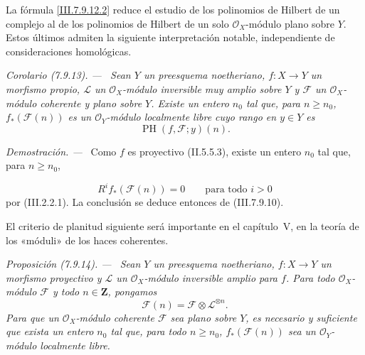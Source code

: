 \documentclass[10pt,oneside]{book}
\newcommand{\bb}[1]{\mathbf{#1}}
\newcommand{\sref}[2][]{\textup{(#2)}}
\newcommand{\oldpage}[2][]{\setcounter{footnote}{0}\marginpar{\scriptsize\textbf{#1}~|~#2}\ignorespaces}
\newenvironment{proposition}[1][]{\par\medskip\noindent\itshape Proposición (#1). ---\ }{\par}
\newenvironment{corollary}[1][]{\par\medskip\noindent\itshape Corolario (#1). ---\ }{\par}
\newenvironment{proof}{\par\medskip\noindent\textit{Demostración. ---\ }}{\par}
\begin{document}
La fórmula \eqref{III.7.9.12.2} reduce el estudio de los
polinomios de Hilbert de un complejo al de los polinomios de
Hilbert de un solo $\mathscr O_X$-módulo plano sobre $Y$.
Estos últimos admiten la siguiente interpretación notable,
independiente de consideraciones homológicas.

\begin{corollary}[7.9.13]
\label{III.7.9.13}
Sean $Y$ un preesquema noetheriano, $f:X\to Y$ un morfismo propio,
$\mathscr L$ un $\mathscr O_X$-módulo inversible muy amplio sobre
$Y$ y $\mathscr F$ un $\mathscr O_X$-módulo coherente y plano
sobre $Y$. Existe un entero $n_0$ tal que, para $n\geq n_0$,
$f_*(\mathscr F(n))$ es un $\mathscr O_Y$-módulo localmente libre
cuyo rango en $y\in Y$ es
\[
  \operatorname{PH}(f,\mathscr F;y)(n).
\]
\end{corollary}

\begin{proof}
Como $f$ es proyectivo \sref[II]{II.5.5.3}, existe un entero $n_0$
tal que, para $n\geq n_0$,

\oldpage[III]{212}
\[
  R^if_*(\mathscr F(n))=0
  \qquad\text{para todo $i>0$}
\]
por \sref{III.2.2.1}. La conclusión se deduce entonces de
\sref{III.7.9.10}.
\end{proof}

El criterio de planitud siguiente será importante en el
capítulo~V, en la teoría de los «móduli» de los haces coherentes.

\begin{proposition}[7.9.14]
\label{III.7.9.14}
Sean $Y$ un preesquema noetheriano, $f:X\to Y$ un morfismo
proyectivo y $\mathscr L$ un $\mathscr O_X$-módulo inversible
amplio para $f$. Para todo $\mathscr O_X$-módulo $\mathscr F$ y
todo $n\in\bb Z$, pongamos
\[
  \mathscr F(n)=\mathscr F\otimes\mathscr L^{\otimes n}.
\]
Para que un $\mathscr O_X$-módulo coherente $\mathscr F$ sea plano
sobre $Y$, es necesario y suficiente que exista un entero $n_0$
tal que, para todo $n\geq n_0$, $f_*(\mathscr F(n))$ sea un
$\mathscr O_Y$-módulo localmente libre.
\end{proposition}
\end{document}
